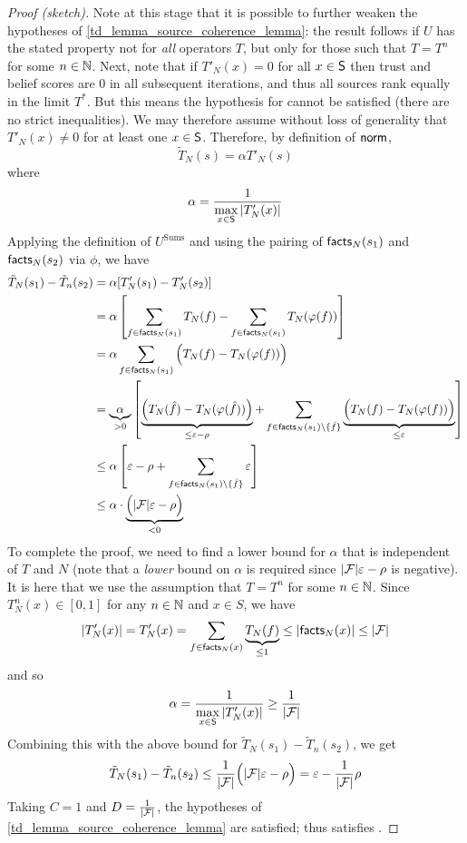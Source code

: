 \begin{proof}[Proof (sketch)]
Note at this stage that it is possible to further weaken the hypotheses of
\cref{td_lemma_source_coherence_lemma}: the result follows if $U$ has the
stated property not for \emph{all} operators $T$, but only for those such that
$T = T^n$ for some $n \in \Nat$. Next, note that if $T'_N(x) = 0$ for all $x
\in \S$ then trust and belief scores are 0 in all subsequent iterations, and
thus all sources rank equally in the limit $T^*$.  But this means the
    hypothesis for \sourcecoherence{} cannot be satisfied (there are no strict
inequalities). We may therefore assume without loss of generality that $T'_N(x)
\ne 0$ for at least one $x \in \S$. Therefore, by definition of $\norm$,
\[
    \tilde{T}_N(s) = \alpha T'_N(s)
\]
where
\[
    \alpha = \frac{1}{\max\limits_{x \in \S}{|T'_N(x)|}}
\]
Applying the definition of $U^{\text{Sums}}$ and using the pairing of $\facts_N(s_1)$
and $\facts_N(s_2)$ via $\phi$, we have
\begin{align*}
    \tilde{T}_N(s_1) - \tilde{T}_n(s_2)
    &= \alpha[T'_N(s_1) - T'_N(s_2)] \\
    &= \alpha \left[
        \sum_{f \in \facts_N(s_1)}{T_N(f)}
        -
        \sum_{f \in \facts_N(s_1)}{T_N(\phi(f))}
    \right] \\
    &= \alpha
        \sum_{f \in \facts_N(s_1)}{
            \Big(
                T_N(f) - T_N(\phi(f))
            \Big)
        } \\
    &= \underbrace{\alpha}_{> 0}
       \left[
        \underbrace{
            \Big(
                T_N(\hat{f}) - T_N(\phi(\hat{f}))
            \Big)
        }_{\le \epsilon - \rho}
        +
        \sum_{f \in \facts_N(s_1) \setminus \{\hat{f}\} }{
            \underbrace{
                \Big(
                    T_N(f) - T_N(\phi(f))
                \Big)
            }_{\le \epsilon}
        }
    \right] \\
    & \le \alpha
       \left[
        \epsilon - \rho
        +
        \sum_{f \in \facts_N(s_1) \setminus \{\hat{f}\} }{
            \epsilon
        }
    \right] \\
    & \le \alpha
      \cdot
      \underbrace{
        \Big(|\F|\epsilon - \rho\Big)
      }_{< 0}
\end{align*}
To complete the proof, we need to find a lower bound for $\alpha$ that is
independent of $T$ and $N$ (note that a \emph{lower} bound on $\alpha$ is
required since $|\F|\epsilon - \rho$ is negative). It is here that we use the
assumption that $T = T^n$ for some $n \in \Nat$. Since $T^n_N(x) \in [0,1]$ for
any $n \in \Nat$ and $x \in S$, we have
\[
    |T_N'(x)|
    = T_N'(x)
    = \sum_{f \in \facts_N(x)}{
           \underbrace{T_N(f)}_{\le 1}
       }
     \le |\facts_N(x)|
     \le |\F|
\]
and so
\[
    \alpha
    = \frac{1}{\max\limits_{x \in \S}{|T'_N(x)|}}
    \ge \frac{1}{|\F|}
\]
Combining this with the above bound for $\tilde{T}_N(s_1) - \tilde{T}_n(s_2)$,
we get
\[
    \tilde{T}_N(s_1) - \tilde{T}_n(s_2)
    \le
    \frac{1}{|\F|} \Big(
        |\F|\epsilon - \rho
    \Big)
    = \epsilon - \frac{1}{|\F|}\rho
\]
Taking $C = 1$ and $D = \frac{1}{|\F|}$, the hypotheses of
\cref{td_lemma_source_coherence_lemma} are satisfied; thus \sums{} satisfies
\sourcecoherence{}.


\end{proof}
